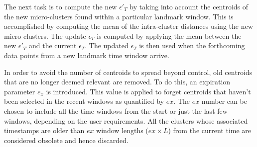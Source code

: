 \documentclass[../UNBThesis2.tex]{subfiles}
\begin{document}
\begin{itemize}[leftmargin=*]
    The next task is to compute the new $\epsilon'_T$ by taking into account the centroids of the new micro-clusters found within a particular landmark window. This is accomplished by computing the mean of the intra-cluster distances using the new micro-clusters. The update $\epsilon_T$ is computed by applying the mean between the new $\epsilon'_T$ and the current $\epsilon_T$. The updated $\epsilon_T$ is then used when the forthcoming data points from a new landmark time window arrive.
    
    
  
    
    

   In order to avoid the number of centroids to spread beyond control, old centroids that are no longer deemed relevant are removed. To do this, an expiration parameter $e_x$ is introduced. This value is applied to forget centroids that haven't been selected in the recent windows as quantified by $ex$. The $ex$ number can be chosen to include all the time windows from the start or just the last few windows, depending on the user requirements. All the clusters whose associated timestamps are older than $ex$ window lengths ($ex \times L$) from the current time are considered obsolete and hence discarded. 
   





\end{itemize}
\end{document}
